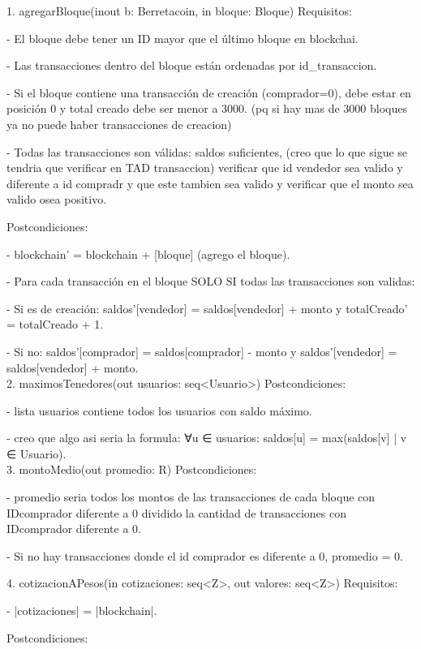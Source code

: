 \documentclass[10pt,a4paper]{article}
\begin{document}
{{1. agregarBloque(inout b: Berretacoin, in bloque: Bloque)
Requisitos:

    - El bloque debe tener un ID mayor que el último bloque en blockchai.

    - Las transacciones dentro del bloque están ordenadas por id_transaccion.

    - Si el bloque contiene una transacción de creación (comprador=0), debe estar en posición 0 y total creado debe ser menor a 3000. (pq si hay mas de 3000 bloques ya no puede haber transacciones de creacion)

    - Todas las transacciones son válidas: saldos suficientes, (creo que lo que sigue se tendria que verificar en TAD transaccion) verificar que id vendedor sea valido y diferente a id compradr y que este tambien sea valido y verificar que el monto sea valido osea positivo.

Postcondiciones:

    - blockchain' = blockchain + [bloque] (agrego el bloque).

    - Para cada transacción en el bloque SOLO SI todas las transacciones son validas:

        - Si es de creación: saldos'[vendedor] = saldos[vendedor] + monto y totalCreado' = totalCreado + 1.

        - Si no: saldos'[comprador] = saldos[comprador] - monto y saldos'[vendedor] = saldos[vendedor] + monto.\\

2. maximosTenedores(out usuarios: seq<Usuario>)
Postcondiciones:

    - lista usuarios contiene todos los usuarios con saldo máximo.

        - creo que algo asi seria la formula: ∀u ∈ usuarios: saldos[u] = max({saldos[v] | v ∈ Usuario}).\\

3. montoMedio(out promedio: R)
Postcondiciones:

    - promedio seria todos los montos de las transacciones de cada bloque con IDcomprador diferente a 0 dividido la cantidad de transacciones con IDcomprador diferente a 0.

    - Si no hay transacciones donde el id comprador es diferente a 0, promedio = 0.

4. cotizacionAPesos(in cotizaciones: seq<Z>, out valores: seq<Z>)
Requisitos:

    - |cotizaciones| = |blockchain|.

Postcondiciones:

}}
\end{document}
